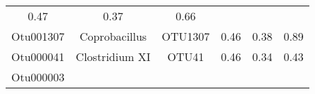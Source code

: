 \documentclass[12pt,]{article}
\begin{document}
\begin{longtable}[]{@{}cccccc@{}}
\begin{minipage}[t]{0.22\columnwidth}
0.47\strut
\end{minipage} & \begin{minipage}[t]{0.17\columnwidth}\centering\strut
0.37\strut
\end{minipage} & \begin{minipage}[t]{0.04\columnwidth}\centering\strut
0.66\strut
\end{minipage}\tabularnewline
\begin{minipage}[t]{0.08\columnwidth}\centering\strut
Otu001307\strut
\end{minipage} & \begin{minipage}[t]{0.17\columnwidth}\centering\strut
Coprobacillus\strut
\end{minipage} & \begin{minipage}[t]{0.15\columnwidth}\centering\strut
OTU1307\strut
\end{minipage} & \begin{minipage}[t]{0.22\columnwidth}\centering\strut
0.46\strut
\end{minipage} & \begin{minipage}[t]{0.17\columnwidth}\centering\strut
0.38\strut
\end{minipage} & \begin{minipage}[t]{0.04\columnwidth}\centering\strut
0.89\strut
\end{minipage}\tabularnewline
\begin{minipage}[t]{0.08\columnwidth}\centering\strut
Otu000041\strut
\end{minipage} & \begin{minipage}[t]{0.17\columnwidth}\centering\strut
Clostridium XI\strut
\end{minipage} & \begin{minipage}[t]{0.15\columnwidth}\centering\strut
OTU41\strut
\end{minipage} & \begin{minipage}[t]{0.22\columnwidth}\centering\strut
0.46\strut
\end{minipage} & \begin{minipage}[t]{0.17\columnwidth}\centering\strut
0.34\strut
\end{minipage} & \begin{minipage}[t]{0.04\columnwidth}\centering\strut
0.43\strut
\end{minipage}\tabularnewline
\begin{minipage}[t]{0.08\columnwidth}\centering\strut
Otu000003\strut
\end{minipage} & \begin{minipage}[t]{0.17\columnwidth}\centering\strut

\end{minipage}
\end{longtable}
\end{document}
